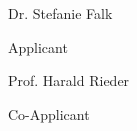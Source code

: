 \vspace{5cm}

\begin{minipage}{.4\textwidth}
  \hrulefill
  
  \hspace*{0mm}\phantom{}Dr. Stefanie Falk
  
  \hspace*{0mm}\phantom{}Applicant
\end{minipage}%
\hfill
\begin{minipage}{.4\textwidth}
  \hrulefill
  
  \hspace*{0mm}\phantom{}Prof. Harald Rieder
  
  \hspace*{0mm}\phantom{}Co-Applicant
\end{minipage}


